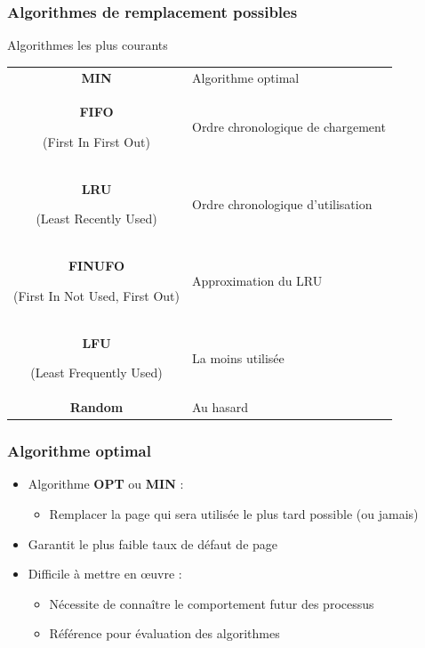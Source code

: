 \begin{frame}
\frametitle{Algorithmes de remplacement possibles}
\begin{block}{Algorithmes les plus courants}
\begin{tabular}{c|l}
\textbf{MIN} & Algorithme optimal \\
\textbf{FIFO} \begin{tiny}(First In First Out)\end{tiny}& Ordre chronologique de chargement \\
\textbf{LRU} \begin{tiny}(Least Recently Used)\end{tiny} & Ordre chronologique d'utilisation \\
\textbf{FINUFO} \begin{tiny}(First In Not Used, First Out)\end{tiny} & Approximation du LRU \\
\textbf{LFU} \begin{tiny}(Least Frequently Used)\end{tiny} & La moins utilisée \\
\textbf{Random} & Au hasard \\
\end{tabular}
\end{block}
\end{frame}


\begin{frame}
\frametitle{Algorithme optimal}
\begin{itemize}
\item Algorithme \textbf{OPT} ou \textbf{MIN} :
\begin{itemize}
\item Remplacer la page qui sera utilisée le plus tard possible (ou jamais)
\end{itemize}
\item Garantit le plus faible taux de défaut de page
\item Difficile à mettre en œuvre :
\begin{itemize}
\item Nécessite de connaître le comportement futur des processus
\item Référence pour évaluation des algorithmes
\end{itemize}
\end{itemize}
\end{frame}



